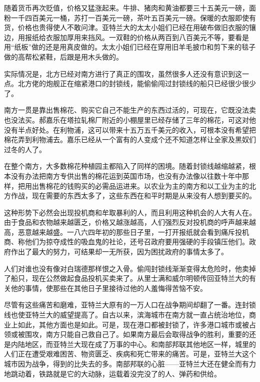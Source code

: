 \par 随着货币再次贬值，价格又猛涨起来。牛排、猪肉和黄油都要三十五美元一磅，面粉一千四百美元一桶，苏打一百美元一磅，茶叶五百美元一磅。保暖的衣服即使有货，价格也贵得使人不敢问津。亚特兰大的太太小姐们已经在用破布做旧衣服的镶边，用报纸给衣服加厚用来挡风。一双鞋的价格从两百到八百美元不等，要看是用“纸板”做的还是用真皮做的。太太小姐们已经在穿用旧羊毛披巾和剪下来的毯子做的高帮松紧鞋，后跟是用木头做的。
\par 实际情况是，北方已经对南方进行了真正的围攻，虽然很多人还没有意识到这一点。北方佬的炮舰正在缩紧港口的封锁线，能偷偷闯过封锁线的船只已经很少很少了。
\par 南方一贯是靠出售棉花、购买它自己不能生产的东西过活的，可现在，它既没法卖也没法买。郝嘉乐在塔拉轧棉厂附近的小棚屋里已经存储了三年的棉花，可这对他没有半点好处。在利物浦，这可以带来十五万五千美元的收入，可根本没有希望把棉花弄到利物浦去。嘉乐已经从一个富有的人变成个还不知道怎样让全家及黑奴们过冬的人了。
\par 在整个南方，大多数棉花种植园主都陷入了同样的困境。随着封锁线越缩越紧，根本没有办法把南方专供出售的棉花运到英国市场，也没有办法像以往数十年中那样，把用出售棉花的钱购买的必需品运进来。以农业为主的南方和以工业为主的北方作战，现在需要的东西太多了，这些东西在和平时期是从来没有人想到要买的。
\par 这种形势下必然会出现投机商和牟取暴利的人，而且利用这种机会的人大有人在。由于食品和衣物越来越匮乏，价格又越涨越高，人们强烈反对投机商的呼声越来越高，恶意越来越盛。一八六四年初的那些日子里，一打开报纸就会看到痛斥投机商、称他们为掠夺成性的吸血鬼的社论，还号召政府要用强硬的手段镇压他们。政府作出了最大的努力，可结果却一无所获，因为困扰政府的事情太多了。
\par 人们对谁也没有像对白瑞德那样恨之入骨。偷闯封锁线渐渐变得太危险时，他卖掉了船只，现在公然做起食品投机买卖来了。从里士满和威尔明顿传回亚特兰大的有关他的事情，使那些在其他日子里接待过他的人羞悔得苦恼不安。
\par 尽管有这些痛苦和磨难，亚特兰大原有的一万人口在战争期间却翻了一番。连封锁线也使亚特兰大的威望提高了。自古以来，滨海城市在南方就一直占统治地位，商业上如此，其他方面也是如此。可是，现在港口都被封锁了，许多港口城市或被占领或被围攻，南方只能自己救自己了。如果南方最后会取得战争的胜利，重要的还是内陆地区，而亚特兰大现在成了万事的中心。和南部邦联其他地区一样，城里的人们正在遭受艰难困苦、物资匮乏、疾病和死亡带来的痛苦。可是，亚特兰大这个城市因为战争，得到的比失去的多。南部邦联的心脏——亚特兰大还在健全而有力地跳动着，铁路就是它的大动脉，运载着没完没了的人、弹药和供给。
\par  
